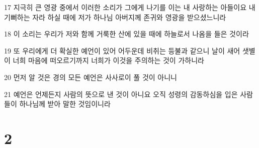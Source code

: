 \par 17 지극히 큰 영광 중에서 이러한 소리가 그에게 나기를 이는 내 사랑하는 아들이요 내 기뻐하는 자라 하실 때에 저가 하나님 아버지께 존귀와 영광을 받으셨느니라
\par 18 이 소리는 우리가 저와 함께 거룩한 산에 있을 때에 하늘로서 나옴을 들은 것이라
\par 19 또 우리에게 더 확실한 예언이 있어 어두운데 비취는 등불과 같으니 날이 새어 샛별이 너희 마음에 떠오르기까지 너희가 이것을 주의하는 것이 가하니라
\par 20 먼저 알 것은 경의 모든 예언은 사사로이 풀 것이 아니니
\par 21 예언은 언제든지 사람의 뜻으로 낸 것이 아니요 오직 성령의 감동하심을 입은 사람들이 하나님께 받아 말한 것임이니라

\chapter{2}

